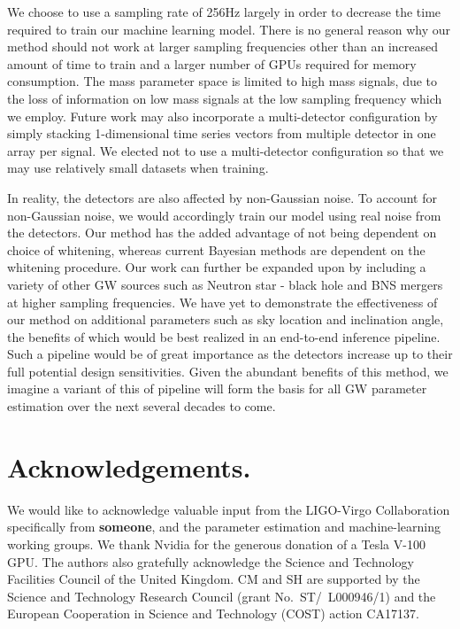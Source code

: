 \documentclass[%
showpacs,
 amsmath,amssymb,
 aps,
 twocolumn,
 prl,
 reprint,
floatfix,
]{revtex4-1}
\begin{document}
%
%
We choose to use a sampling rate of 256Hz largely in order to 
decrease the time required to train our machine learning model. 
There is no general reason why our method 
should not work at larger sampling frequencies other than an 
increased amount of time to train and a larger 
number of GPUs required for memory consumption. The mass parameter space is limited 
to high mass signals, due to the loss of information on low mass 
signals at the low sampling frequency which we employ. Future work 
may also incorporate a multi-detector configuration by simply stacking 
1-dimensional time series vectors from multiple detector in one array 
per signal. We elected not to use a multi-detector configuration so 
that we may use relatively small datasets when training.

In reality, the detectors are also affected by non-Gaussian noise. 
To account for non-Gaussian noise, we would accordingly train our model using real noise from the detectors. Our method has the added 
advantage of not being dependent on choice of whitening, whereas 
current Bayesian methods are dependent on the whitening procedure. 
Our work can further be expanded upon by including a variety of
other \ac{GW} sources such as Neutron star - black hole and \ac{BNS} mergers at higher
sampling frequencies. We have yet to demonstrate the effectiveness of our method
on additional parameters such as sky location and inclination angle, the
benefits of which would be best realized in an end-to-end inference pipeline.
Such a pipeline would be of great importance as the detectors increase up to
their full potential design sensitivities. Given the abundant 
benefits of this method, we imagine a variant of 
this of pipeline will form the basis for all \ac{GW} parameter 
estimation over the next several decades to come.

%
%
\section{Acknowledgements.}
%
We would like to acknowledge valuable input from the LIGO-Virgo Collaboration
specifically from {\textbf{someone}}, and the parameter estimation and
machine-learning working groups. We thank Nvidia for the generous 
donation of a Tesla V-100 GPU. The authors also gratefully acknowledge the
Science and Technology Facilities Council of the United Kingdom. CM and SH are
supported by the Science and Technology Research Council (grant
No.~ST/~L000946/1) and the European Cooperation in Science and Technology
(COST) action CA17137.
\end{document}
